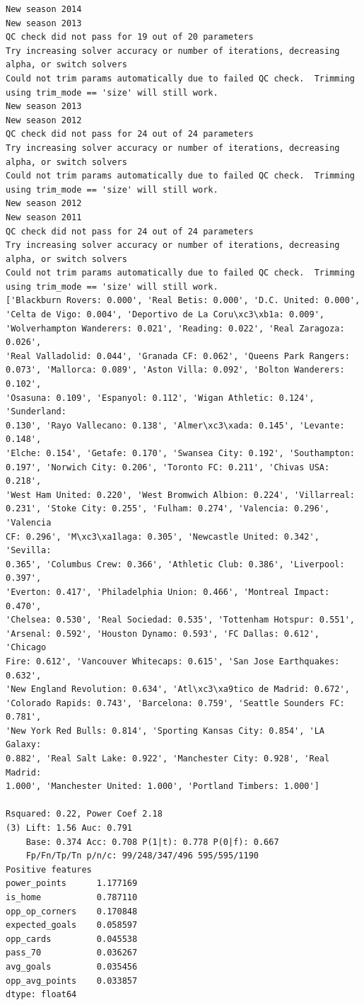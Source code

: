 \documentclass[12pt,fleqn]{article}\usepackage{../common}
\begin{document}
\begin{verbatim}
New season 2014
New season 2013
QC check did not pass for 19 out of 20 parameters
Try increasing solver accuracy or number of iterations, decreasing alpha, or switch solvers
Could not trim params automatically due to failed QC check.  Trimming using trim_mode == 'size' will still work.
New season 2013
New season 2012
QC check did not pass for 24 out of 24 parameters
Try increasing solver accuracy or number of iterations, decreasing alpha, or switch solvers
Could not trim params automatically due to failed QC check.  Trimming using trim_mode == 'size' will still work.
New season 2012
New season 2011
QC check did not pass for 24 out of 24 parameters
Try increasing solver accuracy or number of iterations, decreasing alpha, or switch solvers
Could not trim params automatically due to failed QC check.  Trimming using trim_mode == 'size' will still work.
['Blackburn Rovers: 0.000', 'Real Betis: 0.000', 'D.C. United: 0.000',
'Celta de Vigo: 0.004', 'Deportivo de La Coru\xc3\xb1a: 0.009',
'Wolverhampton Wanderers: 0.021', 'Reading: 0.022', 'Real Zaragoza: 0.026',
'Real Valladolid: 0.044', 'Granada CF: 0.062', 'Queens Park Rangers:
0.073', 'Mallorca: 0.089', 'Aston Villa: 0.092', 'Bolton Wanderers: 0.102',
'Osasuna: 0.109', 'Espanyol: 0.112', 'Wigan Athletic: 0.124', 'Sunderland:
0.130', 'Rayo Vallecano: 0.138', 'Almer\xc3\xada: 0.145', 'Levante: 0.148',
'Elche: 0.154', 'Getafe: 0.170', 'Swansea City: 0.192', 'Southampton:
0.197', 'Norwich City: 0.206', 'Toronto FC: 0.211', 'Chivas USA: 0.218',
'West Ham United: 0.220', 'West Bromwich Albion: 0.224', 'Villarreal:
0.231', 'Stoke City: 0.255', 'Fulham: 0.274', 'Valencia: 0.296', 'Valencia
CF: 0.296', 'M\xc3\xa1laga: 0.305', 'Newcastle United: 0.342', 'Sevilla:
0.365', 'Columbus Crew: 0.366', 'Athletic Club: 0.386', 'Liverpool: 0.397',
'Everton: 0.417', 'Philadelphia Union: 0.466', 'Montreal Impact: 0.470',
'Chelsea: 0.530', 'Real Sociedad: 0.535', 'Tottenham Hotspur: 0.551',
'Arsenal: 0.592', 'Houston Dynamo: 0.593', 'FC Dallas: 0.612', 'Chicago
Fire: 0.612', 'Vancouver Whitecaps: 0.615', 'San Jose Earthquakes: 0.632',
'New England Revolution: 0.634', 'Atl\xc3\xa9tico de Madrid: 0.672',
'Colorado Rapids: 0.743', 'Barcelona: 0.759', 'Seattle Sounders FC: 0.781',
'New York Red Bulls: 0.814', 'Sporting Kansas City: 0.854', 'LA Galaxy:
0.882', 'Real Salt Lake: 0.922', 'Manchester City: 0.928', 'Real Madrid:
1.000', 'Manchester United: 1.000', 'Portland Timbers: 1.000'] 

Rsquared: 0.22, Power Coef 2.18
(3) Lift: 1.56 Auc: 0.791
    Base: 0.374 Acc: 0.708 P(1|t): 0.778 P(0|f): 0.667
    Fp/Fn/Tp/Tn p/n/c: 99/248/347/496 595/595/1190
Positive features
power_points      1.177169
is_home           0.787110
opp_op_corners    0.170848
expected_goals    0.058597
opp_cards         0.045538
pass_70           0.036267
avg_goals         0.035456
opp_avg_points    0.033857
dtype: float64


\end{verbatim}
\end{document}

